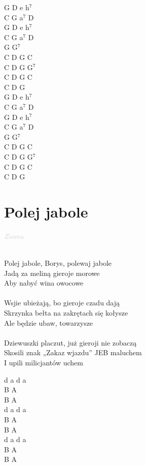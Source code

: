 \documentclass[a5paper, 10pt]{book}
\begin{document}
\begin{minipage}[t]{0.2\textwidth}
G D e h$^7$\\
C G a$^7$ D\\
G D e h$^7$\\
C G a$^7$ D\\
G G$^7$\\

C D G C\\
C D G G$^7$\\
C D G C\\
C D G\\

G D e h$^7$\\
C G a$^7$ D\\
G D e h$^7$\\
C G a$^7$ D\\
G G$^7$\\

C D G C\\
C D G G$^7$\\
C D G C\\
C D G\\
\end{minipage}

\newpage
\section{Polej jabole}\textcolor{lightgray}{\textit{Zioma}}\\~\\
\begin{minipage}[t]{0.8\textwidth}
Polej jabole, Borys, polewaj jabole\\
Jadą za meliną gieroje morowe\\
Aby nabyć wina owocowe\\
\\
Wsjie ubieżają, bo gieroje czadu dają\\
Skrzynka bełta na zakrętach się kołysze\\
Ale będzie ubaw, towarzysze\\
\\
Dziewuszki placzut, już gieroji nie zobaczą\\
Skosili znak „Zakaz wjazdu” JEB maluchem\\
I upili milicjantów uchem\\
\end{minipage}
\begin{minipage}[t]{0.2\textwidth}
d a d a\\
B A\\
B A\\

d a d a\\
B A\\
B A\\

d a d a\\
B A\\
B A\\
\end{minipage}
\end{document}
